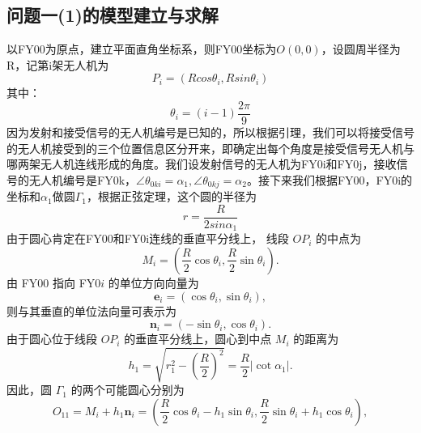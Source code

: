\documentclass[UTF-8,a4paper,zihao=-4]{ctexart}
\begin{document}
\subsection{问题一(1)的模型建立与求解}
以FY00为原点，建立平面直角坐标系，则FY00坐标为$O(0,0)$，设圆周半径为R，记第i架无人机为
\begin{equation}
    P_i=(Rcos\theta_i, Rsin\theta_i)
\end{equation}
其中：
\begin{equation}
    \theta_i=(i-1)\frac{2\pi}{9}
\end{equation}
因为发射和接受信号的无人机编号是已知的，所以根据引理，我们可以将接受信号的无人机接受到的三个位置信息区分开来，即确定出每个角度是接受信号无人机与哪两架无人机连线形成的角度。我们设发射信号的无人机为FY0i和FY0j，接收信号的无人机编号是FY0k，$\angle \theta_{0ki}=\alpha_1,\angle \theta_{0kj}=\alpha_2$。接下来我们根据FY00，FY0i的坐标和$\alpha_1$做圆$\Gamma_1$，根据正弦定理，这个圆的半径为
\begin{equation}
    r=\frac{R}{2sin\alpha_1}
\end{equation}
由于圆心肯定在FY00和FY0i连线的垂直平分线上，
线段 $OP_i$ 的中点为
\begin{equation}
M_i=
\left(
\frac{R}{2}\cos\theta_i,
\frac{R}{2}\sin\theta_i
\right).
\end{equation}
由 FY00 指向 FY0$i$ 的单位方向向量为
\begin{equation}
\boldsymbol e_i=
\left(
\cos\theta_i,\sin\theta_i
\right),
\end{equation}
则与其垂直的单位法向量可表示为
\begin{equation}
\boldsymbol n_i=
\left(
-\sin\theta_i,\cos\theta_i
\right).
\end{equation}
由于圆心位于线段 $OP_i$ 的垂直平分线上，圆心到中点
$M_i$ 的距离为
\begin{equation}
h_1
=
\sqrt{
r_1^2-\left(\frac{R}{2}\right)^2
}
=
\frac{R}{2}\left|\cot\alpha_1\right|.
\end{equation}
因此，圆 $\Gamma_1$ 的两个可能圆心分别为
\begin{equation}
O_{11}
=
M_i+h_1\boldsymbol n_i
=
\left(
\frac{R}{2}\cos\theta_i-h_1\sin\theta_i,
\frac{R}{2}\sin\theta_i+h_1\cos\theta_i
\right),
\end{equation}
\end{document}

